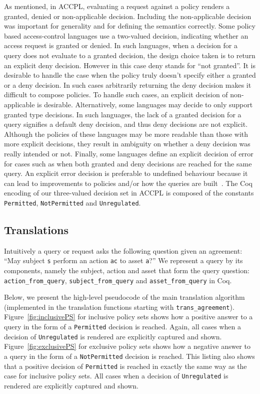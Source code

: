 \documentclass[conference]{IEEEtran}
\newcommand{\syn}{\texttt}
\begin{document}
As mentioned, in ACCPL, evaluating a request against a policy renders
a granted, denied or non-applicable decision. Including the non-applicable decision was
important for generality and for defining the semantics correctly.
Some policy based access-control languages use a two-valued decision,
indicating whether an access request is granted or denied. In
such languages, when a decision for a query does not evaluate to a granted decision, the design choice taken is to return an explicit deny
decision. However in this case deny stands for ``not granted''.
It is desirable to handle the case when the policy truly doesn't
specify either a granted or a deny decision. In such cases
arbitrarily returning the deny decision makes it difficult to
compose policies. To handle such cases, an explicit decision of non-applicable is desirable. Alternatively, some languages may decide
to only support granted type decisions. In such languages, the lack of a
granted decision for a query signifies a default deny decision,
and thus deny decisions are not explicit. Although the policies of
these languages may be more readable than those with more explicit
decisions, they result in ambiguity on whether a deny decision was
really intended or not. Finally, some languages define an explicit
decision of error for cases such as when both granted and
deny decisions are reached for the same query. An explicit
error decision is preferable to undefined behaviour because it can
lead to improvements to policies and/or how the queries are
built~\cite{Tschantz}. The Coq encoding of our three-valued decision
set in \ac{ACCPL} is composed of the constants \syn{Permitted},
\syn{NotPermitted} and \syn{Unregulated}.

\subsection{Translations}\label{sec:translationfuncs}

Intuitively a query or request asks the following question given an agreement: ``May subject \syn{s} perform an action \syn{ac} to asset \syn{a}?'' We represent a query by its components, namely the subject, action and asset that form the query question: \syn{action_from_query}, \syn{subject_from_query} and \syn{asset_from_query} in Coq. 

 
Below, we present the high-level pseudocode of the main translation algorithm (implemented in the translation functions starting with \syn{trans_agreement}).
%
Figure~\ref{fig:inclusivePS} for inclusive policy sets shows how a positive answer to a query in the form of a \syn{Permitted} decision is reached. Again, all cases when a decision of \syn{Unregulated} is rendered are explicitly captured and shown. Figure~\ref{fig:exclusivePS} for exclusive policy sets shows how a negative answer to a query in the form of a \syn{NotPermitted} decision is reached. This listing also shows that a positive decision of \syn{Permitted} is reached in exactly the same way as the case for inclusive policy sets. All cases when a decision of \syn{Unregulated} is rendered are explicitly captured and shown.
\end{document}
